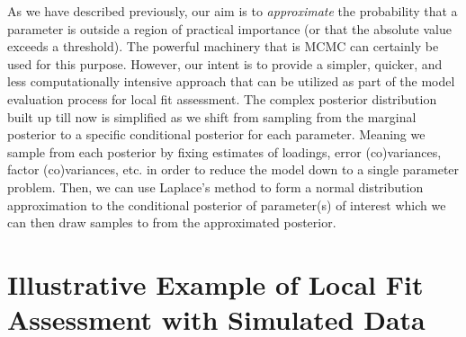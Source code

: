 \documentclass[noextraspace, floatsintext, 12pt]{apa7}
\begin{document}
As we have described previously, our aim is to \textit{approximate} the probability that a parameter is outside a region of practical importance (or that the absolute value exceeds a threshold).
The powerful machinery that is MCMC can certainly be used for this purpose.
However, our intent is to provide a simpler, quicker, and less computationally intensive approach that can be utilized as part of the model evaluation process for local fit assessment.
The complex posterior distribution built up till now is simplified as we shift from sampling from the marginal posterior to a specific conditional posterior for each parameter.
Meaning we sample from each posterior by fixing estimates of loadings, error (co)variances, factor (co)variances, etc. in order to reduce the model down to a single parameter problem.
Then, we can use Laplace's method to form a normal distribution approximation to the conditional posterior of parameter(s) of interest which we can then draw samples to from the approximated posterior.

\section{Illustrative Example of Local Fit Assessment with Simulated Data}
\end{document}
